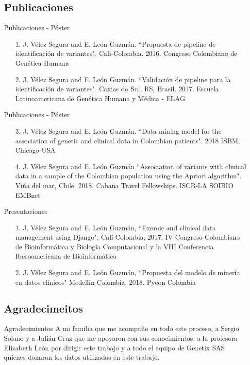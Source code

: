 \documentclass[xcolor=dvipsnames]{beamer}
\begin{document}
\subsection{Publicaciones}
\begin{frame}{Publicaciones - Póster}
\begin{itemize}
\justifying
	\item[1.] J. Vélez Segura and E. León Guzmán. ``Propuesta de pipeline de identificación de variantes". Cali-Colombia. 2016. Congreso Colombiano de Genética Humana
	\item[2.] J. Vélez Segura and E. León Guzmán. ``Validación de pipeline para la identificación de variantes". Caxias do Sul, RS, Brasil. 2017. Escuela Latinoamericana de Genética Humana y Médica - ELAG

\end{itemize}
\end{frame}

\begin{frame}{Publicaciones - Póster}
\begin{itemize}
\justifying
	\item[3.] J. Vélez Segura and E. León Guzmán. ``Data mining model for the association of genetic and clinical data in Colombian patients". 2018 ISBM, Chicago-USA
	\item[4.] J. Vélez Segura and E. León Guzmán ``Association of variants with clinical data in a sample of the Colombian population using the Apriori algorithm".  Viña del mar, Chile. 2018. Cabana Travel Fellowships. ISCB-LA SOIBIO EMBnet
\end{itemize}
\end{frame}

\begin{frame}{Presentaciones}
\begin{itemize}
\justifying
    \item[1.] J. Vélez Segura and E. León Guzmán, ``Exomic and clinical data management using Django", Cali-Colombia, 2017. IV Congreso Colombiano de Bioinformática y Biología Computacional y la VIII Conferencia Iberoamericana de Bioinformática
    
	\item[2.] J. Vélez Segura and E. León Guzmán, ``Propuesta del modelo de minería en datos clínicos" Medellin-Colombia. 2018. Pycon Colombia
\end{itemize}
\end{frame}

\subsection{Agradecimeitos}
\begin{frame}{Agradecimientos}
 \justifying 
    A mi familia que me acompaño en todo este proceso, a Sergio Solano y a Julián Cruz que me apoyaron con sus conocimientos, a la profesora Elizabeth León por dirigir este trabajo y a todo el equipo de Genetix SAS quienes donaron los datos utilizados en este trabajo.
\end{frame}
\end{document}
